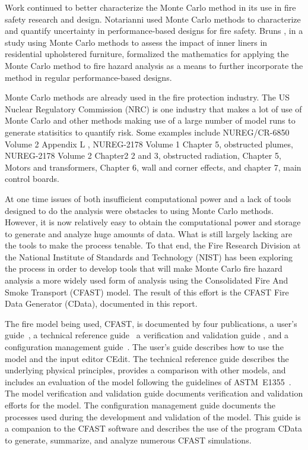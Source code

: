 \documentclass[12pt,twoside]{book}
\begin{document}
Work continued to better characterize the Monte Carlo method in its use in fire safety research and design. Notarianni \cite{Notarianni:2000} used Monte Carlo methods to characterize and quantify uncertainty in performance-based designs for fire safety. Bruns \cite{bruns_tn_2016}, in a study using Monte Carlo methods to assess the impact of inner liners in residential upholstered furniture, formalized the mathematics for applying the Monte Carlo method to fire hazard analysis as a means to further incorporate the method in regular performance-based designs.

Monte Carlo methods are already used in the fire protection industry. The US Nuclear Regulatory Commission (NRC) is one industry that makes a lot of use of Monte Carlo and other methods making use of a large number of model runs to generate statisitics to quantify risk. Some examples include NUREG/CR-6850 Volume 2 Appendix L \cite{NRCNUREGCR6850V2}, NUREG-2178 Volume 1 \cite{NRCNUREG2178V1} Chapter 5, obstructed plumes,  NUREG-2178 Volume 2 \cite{NRCNUREG2178V2} Chapter2 2 and 3, obstructed radiation, Chapter 5, Motors and transformers, Chapter 6, wall and corner effects, and chapter 7, main control boards. 

At one time issues of both insufficient computational power and a lack of tools designed to do the analysis were obstacles to using Monte Carlo methods. However, it is now relatively easy to obtain the computational power and storage to generate and analyze huge amounts of data. What is still largely lacking are the tools to make the process tenable. To that end, the Fire Research Division at the National Institute of Standards and Technology (NIST) has been exploring the process \cite{NIST_TN_2041,Reneke_2017,Reneke_2018,Cleary_2019} in order to develop tools that will make Monte Carlo fire hazard analysis a more widely used form of analysis using the Consolidated Fire And Smoke Transport (CFAST) model. The result of this effort is the CFAST Fire Data Generator (CData), documented in this report.

The fire model being used, CFAST, is documented by four publications, a user's guide~\cite{CFAST_Users_Guide_7}, a technical reference guide~\cite{CFAST_Tech_Guide_7} a verification and validation guide \cite{CFAST_Valid_Guide_7}, and a configuration management guide~\cite{CFAST_Config_Guide_7}. The user's guide describes how to use the model and the input editor CEdit. The technical reference guide describes the underlying physical principles, provides a comparison with other models, and includes an evaluation of the model following the guidelines of ASTM~E1355~\cite{CFAST:ASTM:E1355}. The model verification and validation guide documents verification and validation efforts for the model. The configuration management guide documents the processes used during the development and validation of the model. This guide is a companion to the CFAST software and describes the use of the program CData to generate, summarize, and analyze numerous CFAST simulations.
\end{document}

